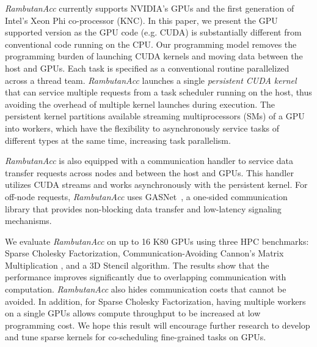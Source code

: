 {\em RambutanAcc} currently supports NVIDIA's GPUs and the first generation of Intel's Xeon Phi co-processor (KNC).
In this paper, we present the GPU supported version as the GPU code (e.g. CUDA) is substantially different from conventional code running on the CPU.
Our programming model removes the programming burden of launching CUDA kernels and moving data between the host and GPUs.
Each task is specified as a conventional routine parallelized across a thread team.
{\em RambutanAcc} launches a single {\em persistent CUDA kernel} that can service multiple requests from a task scheduler running on the host, thus avoiding the overhead of multiple kernel launches during execution.
The persistent kernel partitions available streaming multiprocessors (SMs) of a GPU into workers, which have the flexibility to asynchronously service tasks of different types at the same time, increasing task parallelism.

{\em RambutanAcc} is also equipped with a communication handler to service data transfer requests across nodes and between the host and GPUs.
This handler utilizes CUDA streams and works asynchronously with the persistent kernel.
For off-node requests, {\em RambutanAcc} uses GASNet~\cite{Bonachea:2002:gasnet}, a one-sided communication library %
that provides non-blocking data transfer and low-latency signaling mechanisms. %

We evaluate {\em RambutanAcc} on up to 16 K80 GPUs using three HPC benchmarks: Sparse Cholesky Factorization, Communication-Avoiding Cannon's Matrix Multiplication \cite{25Dcannon}, and a 3D Stencil algorithm.
The results show that the performance improves significantly due to overlapping communication with computation.
{\em RambutanAcc} also hides communication costs that cannot be avoided.
In addition, for Sparse Cholesky Factorization, having multiple workers on a single GPUs allows compute throughput to be increased at low programming cost. 
We hope this result will encourage further research to develop and tune sparse kernels for co-scheduling fine-grained tasks on GPUs.

